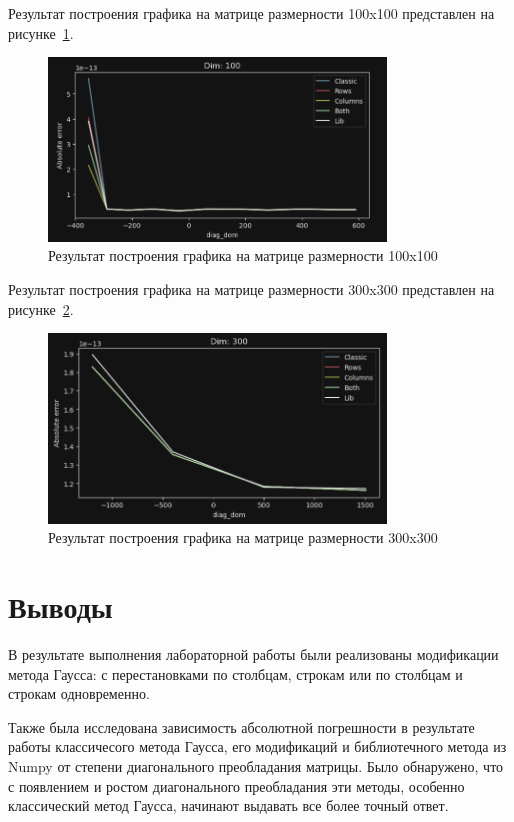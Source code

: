 \documentclass[a4paper, 14pt]{extarticle}
\begin{document}
Результат построения графика на матрице размерности 100x100 представлен на рисунке~\ref{fig:img2}.


\begin{figure}[H]
\centering
\includegraphics[width=0.8\textwidth]{images/res2.png}
\caption{Результат построения графика на матрице размерности 100x100}
\label{fig:img2}
\end{figure}


Результат построения графика на матрице размерности 300x300 представлен на рисунке~\ref{fig:img3}.

\begin{figure}[H]
\centering
\includegraphics[width=0.8\textwidth]{images/res3.png}
\caption{Результат построения графика на матрице размерности 300x300}
\label{fig:img3}
\end{figure}


\section{Выводы}
В результате выполнения лабораторной работы были реализованы модификации метода Гаусса: с перестановками по столбцам, строкам или по столбцам и строкам одновременно.

Также была исследована зависимость абсолютной погрешности в результате работы классичесого метода Гаусса, его модификаций и библиотечного метода из Numpy от степени диагонального преобладания матрицы. Было обнаружено, что с появлением и ростом диагонального преобладания эти методы, особенно классический метод Гаусса, начинают выдавать все более точный ответ.
\end{document}
